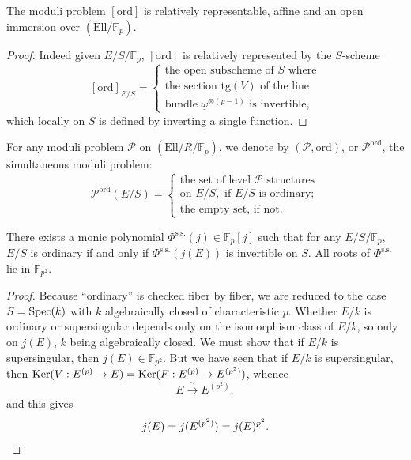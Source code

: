 \begin{klem}\label{lem:12.5.2}
The moduli problem $[\mathrm{ord}]$ is relatively representable, affine and an open immersion over $(\mathrm{Ell}/\mathbb{F}_p)$.
\end{klem}

\begin{proof}
Indeed given $E/S/\mathbb{F}_p$, $[\mathrm{ord}]$ is relatively represented by the $S$-scheme
\[
[\mathrm{ord}]_{E/S} = \begin{cases}
\text{the open subscheme of } S \text{ where} \\
\text{the section } \mathrm{tg}(V) \text{ of the line} \\
\text{bundle } \underline{\omega}^{\otimes (p-1)} \text{ is invertible,}
\end{cases}
\]
which locally on $S$ is defined by inverting a single function.
\end{proof}

\kmitem\label{item:12.5.3}
For any moduli problem $\mathcal{P}$ on $(\mathrm{Ell}/R/\mathbb{F}_p)$, we denote by $(\mathcal{P},\mathrm{ord})$, or $\mathcal{P}^{\mathrm{ord}}$, the simultaneous moduli problem:
\[
\mathcal{P}^{\mathrm{ord}}(E/S) = \begin{cases}
\text{the set of level } \mathcal{P} \text{ structures} \\
\text{on } E/S, \text{ if } E/S \text{ is ordinary}; \\
\text{the empty set, if not.}
\end{cases}
\]

\begin{klem}\label{lem:12.5.4}
There exists a monic polynomial $\Phi^{\mathrm{s.s.}}(j) \in \mathbb{F}_p[j]$ such that for any $E/S/\mathbb{F}_p$, $E/S$ is ordinary if and only if $\Phi^{\mathrm{s.s.}}(j(E))$ is invertible on $S$. All roots of $\Phi^{\mathrm{s.s.}}$ lie in $\mathbb{F}_{p^2}$.
\end{klem}

\begin{proof}
Because ``ordinary'' is checked fiber by fiber, we are reduced to the case $S = \operatorname{Spec}(k)$ with $k$ algebraically closed of characteristic $p$. Whether $E/k$ is ordinary or supersingular depends only on the isomorphism class of $E/k$, so only on $j(E)$, $k$ being algebraically closed. We must show that if $E/k$ is supersingular, then $j(E) \in \mathbb{F}_{p^2}$. But we have seen that if $E/k$ is supersingular, then $\operatorname{Ker}(V : E^{(p)} \to E) = \operatorname{Ker}(F : E^{(p)} \to E^{(p^2)})$, whence
\[
E \xrightarrow{\ \sim\ } E^{(p^2)} ,
\]
and this gives
\[
j(E) = j(E^{(p^2)}) = j(E)^{p^2} . \qedhere
\]
\end{proof}

